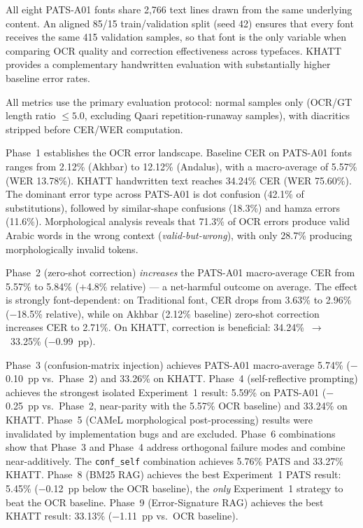 All eight PATS-A01 fonts share 2,766 text lines drawn from the same underlying
content. An aligned 85/15 train/validation split (seed 42) ensures that every
font receives the same 415 validation samples, so that font is the only
variable when comparing OCR quality and correction effectiveness across
typefaces. KHATT provides a complementary handwritten evaluation with
substantially higher baseline error rates.

All metrics use the primary evaluation protocol: normal samples only
(OCR/GT length ratio $\leq 5.0$, excluding Qaari repetition-runaway samples),
with diacritics stripped before CER/WER computation.

Phase~1 establishes the OCR error landscape. Baseline CER on PATS-A01 fonts
ranges from 2.12\% (Akhbar) to 12.12\% (Andalus), with a macro-average of
5.57\% (WER 13.78\%). KHATT handwritten text reaches 34.24\% CER (WER 75.60\%).
The dominant error type across PATS-A01 is dot confusion (42.1\% of
substitutions), followed by similar-shape confusions (18.3\%) and hamza
errors (11.6\%). Morphological analysis reveals that 71.3\% of OCR errors
produce valid Arabic words in the wrong context (\textit{valid-but-wrong}),
with only 28.7\% producing morphologically invalid tokens.

Phase~2 (zero-shot correction) \textit{increases} the PATS-A01 macro-average
CER from 5.57\% to 5.84\% ($+$4.8\% relative) --- a net-harmful outcome on
average. The effect is strongly font-dependent: on Traditional font, CER drops
from 3.63\% to 2.96\% ($-$18.5\% relative), while on Akhbar (2.12\% baseline)
zero-shot correction increases CER to 2.71\%. On KHATT, correction is
beneficial: 34.24\%~$\to$~33.25\% ($-$0.99~pp).

Phase~3 (confusion-matrix injection) achieves PATS-A01 macro-average 5.74\%
($-$0.10~pp vs.\ Phase~2) and 33.26\% on KHATT. Phase~4 (self-reflective
prompting) achieves the strongest isolated Experiment~1 result: 5.59\% on
PATS-A01 ($-$0.25~pp vs.\ Phase~2, near-parity with the 5.57\% OCR baseline)
and 33.24\% on KHATT. Phase~5 (CAMeL morphological post-processing) results
were invalidated by implementation bugs and are excluded. Phase~6 combinations
show that Phase~3 and Phase~4 address orthogonal failure modes and combine
near-additively. The \texttt{conf\_self} combination achieves 5.76\% PATS and
33.27\% KHATT. Phase~8 (BM25 RAG) achieves the best Experiment~1 PATS result:
5.45\% ($-$0.12~pp below the OCR baseline), the \emph{only} Experiment~1
strategy to beat the OCR baseline. Phase~9 (Error-Signature RAG) achieves the
best KHATT result: 33.13\% ($-$1.11~pp vs.\ OCR baseline).

